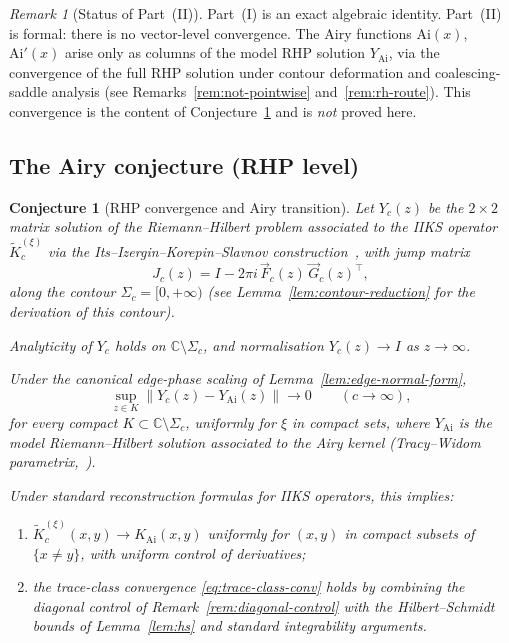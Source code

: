 \documentclass[12pt,a4paper]{amsart}
\newtheorem{conjecture}[theorem]{Conjecture}
\theoremstyle{definition}
\theoremstyle{remark}
\newtheorem{remark}[theorem]{Remark}
\newcommand{\Ai}{\mathrm{Ai}}
\begin{document}
\begin{remark}[Status of Part~(II)]
\label{rem:iiks-status}
Part~(I) is an exact algebraic identity.
Part~(II) is formal: there is no vector-level convergence.
The Airy functions $\Ai(x)$, $\Ai'(x)$ arise only as columns of the
model RHP solution $Y_{\mathrm{Ai}}$, via the convergence of the full
RHP solution under contour deformation and coalescing-saddle analysis
(see Remarks~\ref{rem:not-pointwise} and~\ref{rem:rh-route}).
This convergence is the content of Conjecture~\ref{conj:airy-transition}
and is \emph{not} proved here.
\end{remark}

\subsection{The Airy conjecture (RHP level)}

\begin{conjecture}[RHP convergence and Airy transition]
\label{conj:airy-transition}
Let $Y_c(z)$ be the $2\times 2$ matrix solution of the
Riemann--Hilbert problem associated to the IIKS operator
$\widetilde{K}_c^{(\xi)}$ via the Its--Izergin--Korepin--Slavnov
construction~\cite{ItsIzergin1990}, with jump matrix
\begin{equation}\label{eq:jump-matrix}
  J_c(z) = I - 2\pi i\,\vec{F}_c(z)\,\vec{G}_c(z)^\top,
\end{equation}
along the contour $\Sigma_c = [0,+\infty)$
(see Lemma~\ref{lem:contour-reduction} for the derivation of this contour).

Analyticity of $Y_c$ holds on $\mathbb{C}\setminus\Sigma_c$,
and normalisation $Y_c(z)\to I$ as $z\to\infty$.

Under the canonical edge-phase scaling of Lemma~\ref{lem:edge-normal-form},
\begin{equation}\label{eq:rhp-convergence}
  \sup_{z\in K}\|Y_c(z) - Y_{\mathrm{Ai}}(z)\| \longrightarrow 0
  \qquad (c\to\infty),
\end{equation}
for every compact $K\subset\mathbb{C}\setminus\Sigma_c$,
uniformly for $\xi$ in compact sets,
where $Y_{\mathrm{Ai}}$ is the model Riemann--Hilbert solution
associated to the Airy kernel
(Tracy--Widom parametrix,~\cite{TraWid1994}).

Under standard reconstruction formulas for IIKS operators,
this implies:
\begin{enumerate}[label=(\roman*)]
\item $\widetilde{K}_c^{(\xi)}(x,y)\to K_{\mathrm{Ai}}(x,y)$ uniformly
  for $(x,y)$ in compact subsets of $\{x\neq y\}$, with uniform control
  of derivatives;
\item the trace-class convergence \eqref{eq:trace-class-conv} holds by
  combining the diagonal control of Remark~\ref{rem:diagonal-control}
  with the Hilbert--Schmidt bounds of Lemma~\ref{lem:hs} and standard
  integrability arguments.
\end{enumerate}
\end{conjecture}
\end{document}
